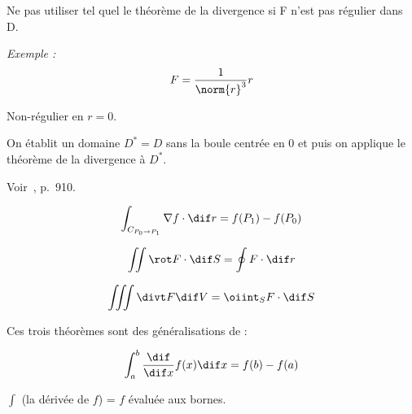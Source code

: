 \begin{myrem}
Ne pas utiliser tel quel le théorème de la divergence si F n'est pas régulier dans D.


\emph{Exemple :} \[F = \dfrac{1}{\norm{r}^3} r \]

Non-régulier en $r=0$.

On établit un domaine $ D^* =D $ sans la boule centrée en 0 et puis on applique le théorème de la divergence à $D^*$.

Voir~\cite{adams2013calculus}, p.~910.
\end{myrem}

\begin{myrem}
\[\int_{C_{P_0 \to P_1}} \nabla f \cdot \dif r = f(P_1) - f(P_0) \]

\[\iint \rot F \cdot \dif S = \oint F \cdot \dif r \]

\[\iiint \divt F \dif V = \oiint_S F \cdot \dif S\]

Ces trois théorèmes sont des généralisations de :

\[\int_a^b \frac{\dif}{\dif x}f(x) \dif x = f(b) - f(a) \]

$\int$ (la dérivée de $f$) = $f$ évaluée aux bornes.
\end{myrem}
